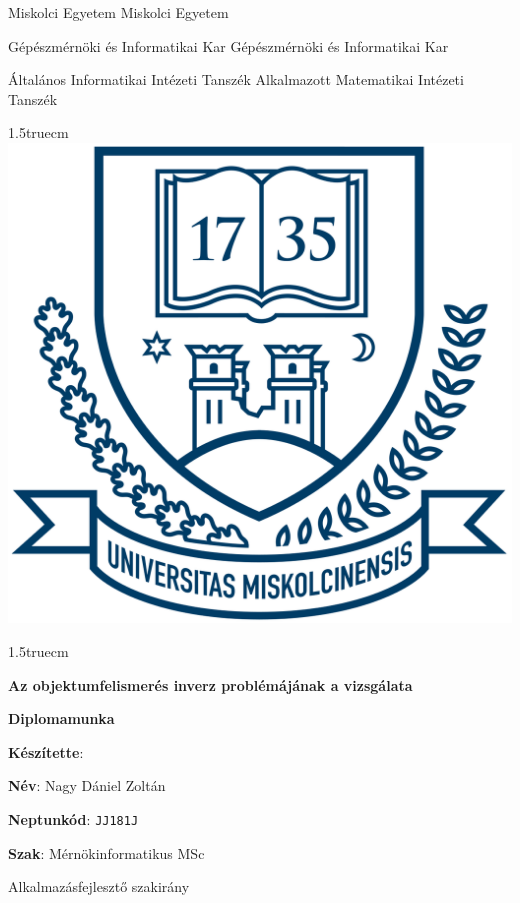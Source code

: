 \pagestyle{empty}

{\small
Miskolci Egyetem \hfill Miskolci Egyetem

Gépészmérnöki és Informatikai Kar \hfill Gépészmérnöki és Informatikai Kar

Általános Informatikai Intézeti Tanszék \hfill \hfill Alkalmazott Matematikai Intézeti Tanszék}

{\large
\begin{center}
\vglue 1.5truecm
\includegraphics[scale=0.15]{images/me_logo.png}\\
\end{center}}

\vglue 1.5truecm

{\huge
\begin{center}
\textbf{Az objektumfelismerés inverz problémájának a vizsgálata}
\end{center}}

\vspace*{1cm}

\begin{center}
\LARGE \textbf{Diplomamunka}
\end{center}

\vspace*{2.5truecm}

{\large
\hspace{6.5cm} \textbf{Készítette}:


\hspace{6.5cm} \textbf{Név}: Nagy Dániel Zoltán


\hspace{6.5cm} \textbf{Neptunkód}: \texttt{JJ181J}


\hspace{6.5cm} \textbf{Szak}: Mérnökinformatikus MSc


\hspace{6.5cm} Alkalmazásfejlesztő szakirány
}

\newpage

